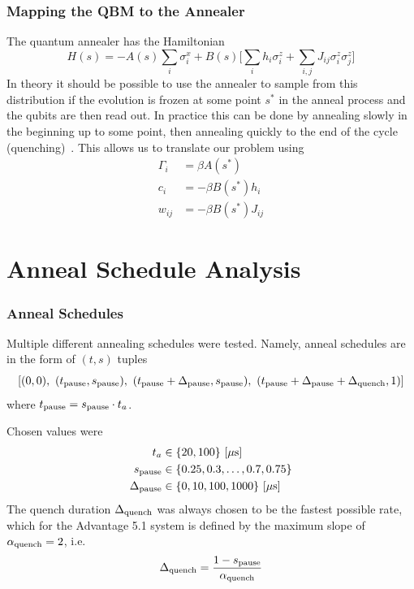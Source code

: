 \documentclass{beamer}
\begin{document}
\begin{frame}
    \frametitle{Mapping the QBM to the Annealer}
    The quantum annealer has the Hamiltonian
    \[
        H(s) = -A(s) \sum_i \sigma_i^x + B(s) \bigg[ \sum_i h_i \sigma_i^z + \sum_{i,j} J_{ij} \sigma_i^z \sigma_j^z \bigg]
    \]
    In theory it should be possible to use the annealer to sample from this distribution if the evolution is frozen at some point \( s^* \) in the anneal process and the qubits are then read out. In practice this can be done by annealing slowly in the beginning up to some point, then annealing quickly to the end of the cycle (quenching)~\cite{amin_2018}.
    This allows us to translate our problem using
    \begin{align*}
        \Gamma_i
            &= \beta A(s^*) \\
        c_i
            &= -\beta B(s^*) h_i \\
        w_{ij}
            &= -\beta B(s^*) J_{ij}
    \end{align*}
\end{frame}


\section{Anneal Schedule Analysis}

\begin{frame}
    \frametitle{Anneal Schedules}
    Multiple different annealing schedules were tested.
    Namely, anneal schedules are in the form of \( (t, s) \) tuples
    \[
        [(0, 0), \ (\tpause, \spause), \ (\tpause + \Deltapause, \spause), \ (\tpause + \Deltapause + \Deltaquench, 1)]
    \]
    where \( t_{\text{pause}} = s_{\text{pause}} \cdot t_a \).

    Chosen values were
    \begin{align*}
        t_a
            &\in \{20, 100\} \ [\mu\text{s}] \\
        s_{\text{pause}}
            &\in \{0.25, 0.3, \dots, 0.7, 0.75\} \\
        \Delta_{\text{pause}}
            &\in \{0, 10, 100, 1000\} \ [\mu\text{s}]
    \end{align*}
    The quench duration \( \Delta_{\text{quench}} \) was always chosen to be the fastest possible rate, which for the Advantage 5.1 system is defined by the maximum slope of \( \alpha_{\text{quench}} = 2 \), i.e.
    \[
        \Delta_{\text{quench}} = \frac{1 - s_{\text{pause}}}{\alpha_{\text{quench}}}
    \]
\end{frame}
\end{document}
